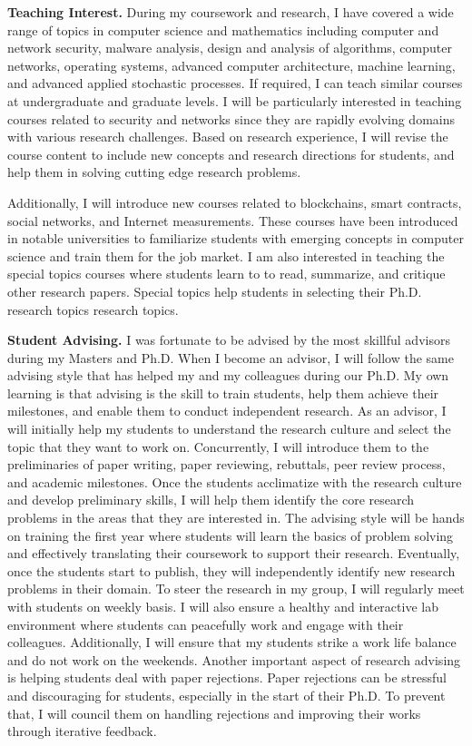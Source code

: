 \documentclass{NSF}
\newcommand{\BfPara}[1]{{\noindent\textbf{#1.}}\xspace}
\begin{document}
\vspace{2mm}
\BfPara{Teaching Interest} During my coursework and research, I have covered a wide range of topics in computer science and mathematics including computer and network security, malware analysis, design and analysis of algorithms, computer networks, operating systems, advanced computer architecture, machine learning, and advanced applied stochastic processes. If required, I can teach similar courses at undergraduate and graduate levels. I will be particularly interested in teaching courses related to security and networks since they are rapidly evolving domains with various research challenges. Based on research experience, I will revise the course content to include new concepts and research directions for students, and help them in solving cutting edge research problems. 

Additionally, I will introduce new courses related to blockchains, smart contracts, social networks, and Internet measurements. These courses have been introduced in notable universities to familiarize students with emerging concepts in computer science and train them for the job market. I am also interested in teaching the special topics courses where students learn to to read, summarize, and critique other research papers. Special topics help students in selecting their Ph.D. research topics research topics.


\vspace{2mm}
\BfPara{Student Advising} I was fortunate to be advised by the most skillful advisors during my Masters and Ph.D. When I become an advisor, I will follow the same advising style that has helped my and my colleagues during our Ph.D. My own learning is that advising is the skill to train students, help them achieve their milestones, and enable them to conduct independent research. As an advisor, I will initially help my students to understand the research culture and select the topic that they want to work on. Concurrently, I will introduce them to the preliminaries of paper writing, paper reviewing, rebuttals, peer review process, and academic milestones. Once the students acclimatize with the research culture and develop preliminary skills, I will help them identify the core research problems in the areas that they are interested in. The advising style will be hands on training the first year where students will learn the basics of problem solving and effectively translating their coursework to support their research. Eventually, once the students start to publish, they will independently identify new research problems in their domain. To steer the research in my group, I will regularly meet with students on weekly basis. I will also ensure a healthy and interactive lab environment where students can peacefully work and engage with their colleagues. Additionally, I will ensure that my students strike a work life balance and do not work on the weekends. Another important aspect of research advising is helping students deal with paper rejections. Paper rejections can be stressful and discouraging for students, especially in the start of their Ph.D. To prevent that, I will council them on handling rejections and improving their works through iterative feedback. 
\end{document}
